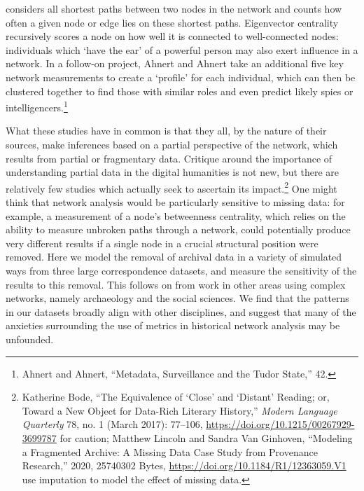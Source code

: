 \documentclass[]{article}
\begin{document}
considers all shortest paths between two nodes in the network and counts how often a given node or edge lies on these shortest paths. Eigenvector centrality recursively scores a node on how well it is connected to well-connected nodes: individuals which `have the ear' of a powerful person may also exert influence in a network. In a follow-on project, Ahnert and Ahnert take an additional five key network measurements to create a `profile' for each individual, which can then be clustered together to find those with similar roles and even predict likely spies or intelligencers.\footnote{Ahnert and Ahnert, ``Metadata, Surveillance and the Tudor State,'' 42.}

What these studies have in common is that they all, by the nature of their sources, make inferences based on a partial perspective of the network, which results from partial or fragmentary data. Critique around the importance of understanding partial data in the digital humanities is not new, but there are relatively few studies which actually seek to ascertain its impact.\footnote{Katherine Bode, ``The Equivalence of `Close' and `Distant' Reading; or, Toward a New Object for Data-Rich Literary History,'' \emph{Modern Language Quarterly} 78, no. 1 (March 2017): 77--106, \url{https://doi.org/10.1215/00267929-3699787} for caution; Matthew Lincoln and Sandra Van Ginhoven, ``Modeling a Fragmented Archive: A Missing Data Case Study from Provenance Research,'' 2020, 25740302 Bytes, \url{https://doi.org/10.1184/R1/12363059.V1} use imputation to model the effect of missing data.} One might think that network analysis would be particularly sensitive to missing data: for example, a measurement of a node's betweenness centrality, which relies on the ability to measure unbroken paths through a network, could potentially produce very different results if a single node in a crucial structural position were removed. Here we model the removal of archival data in a variety of simulated ways from three large correspondence datasets, and measure the sensitivity of the results to this removal. This follows on from work in other areas using complex networks, namely archaeology and the social sciences. We find that the patterns in our datasets broadly align with other disciplines, and suggest that many of the anxieties surrounding the use of metrics in historical network analysis may be unfounded.
\end{document}
